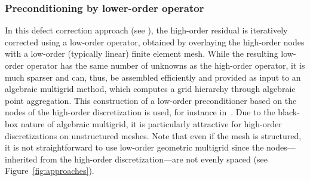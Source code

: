 \documentclass[times]{nlaauth}
\newcommand{\gsnote}[1]{\textcolor{blue}{GS: #1}}
\begin{document}
\subsubsection{Preconditioning by lower-order operator} \label{subsec:low}
In this defect correction approach (see
\cite{TrottenbergOosterleeSchuller01, Hackbusch85}), the high-order
residual is iteratively corrected using a low-order operator,
obtained by overlaying the high-order nodes with a low-order
(typically linear) finite element mesh. While the resulting low-order
operator has the same number of unknowns as the high-order operator,
it is much sparser and can, thus, be assembled efficiently and
provided as input to an algebraic multigrid method, which computes a
grid hierarchy through algebraic point aggregation.  This construction
of a low-order preconditioner based on the nodes of the high-order
discretization is used, for instance in~\cite{Brown10, Kim07,
  DevilleMund90, HeysManteuffelMcCormickEtAl05}. Due to the black-box
nature of algebraic multigrid, it is particularly attractive for
high-order discretizations on unstructured meshes. Note that even if
the mesh is structured, it is not
straightforward to use low-order geometric multigrid since the nodes---inherited from the high-order discretization---are not evenly spaced
(see Figure~\ref{fig:approaches}).








\end{document}
